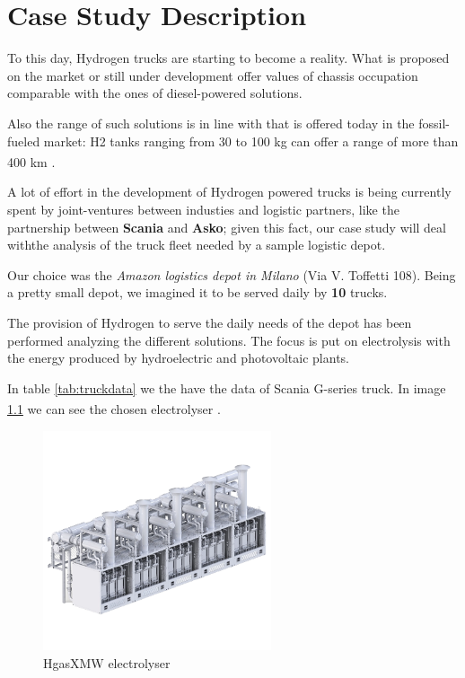 \newpage
\chapter{Case Study Description}

To this day, Hydrogen trucks are starting to become a reality. 
What is proposed on the market or still under development offer values of  chassis occupation comparable with the ones of diesel-powered solutions.

Also the range of such solutions is in line with that is offered today in the fossil-fueled market: H2 tanks ranging from 30 to 100 kg can offer a range of more than 400 km \textsuperscript{\cite{pianoidrogeno}}.

A lot of effort in the development of Hydrogen powered trucks is being currently spent by joint-ventures between industies and logistic partners, like the partnership between \textbf{Scania} and \textbf{Asko}; given this fact, our case study will deal withthe analysis of the truck fleet needed by a sample logistic depot.

Our choice was the \textit{Amazon logistics depot in Milano}  (Via V. Toffetti 108). 
Being a pretty small depot, we imagined it to be served daily by \textbf{10} trucks.


The provision of Hydrogen to serve the daily needs of the depot has been performed analyzing the different solutions.
The focus is put on electrolysis with the energy produced by hydroelectric and photovoltaic plants.

In table \ref{tab:truckdata} we the have the data of Scania G-series truck. In image \ref{fig:electrolyser} we can see the chosen electrolyser \textsuperscript{\cite{2021HGas10MWSystem}}.


\begin{figure}[h]
    \centering
    \includegraphics[width=0.6\textwidth]{Chapters/Pictures/Megastack-0X-5f524dc0.png}
    \caption{HgasXMW electrolyser}
    \label{fig:electrolyser}
\end{figure}


